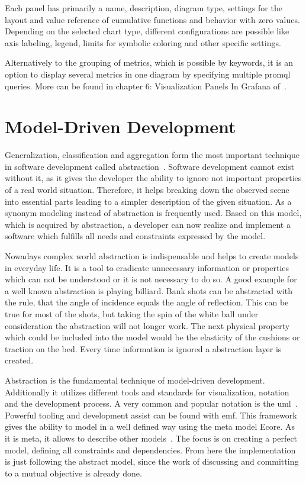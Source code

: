 Each panel has primarily a name, description, diagram type, settings for the layout and value reference of cumulative functions and behavior with zero values. Depending on the selected chart type, different configurations are possible like axis labeling, legend, limits for symbolic coloring and other specific settings.

Alternatively to the grouping of metrics, which is possible by keywords, it is an option to display several metrics in one diagram by specifying multiple \gls{promql} queries. More can be found in chapter 6: Visualization Panels In Grafana of~\cite{Salituro2020}.

\section{Model-Driven Development}

Generalization, classification and aggregation form the most important technique in software development called abstraction~\cite{Brambilla_2017}. Software development cannot exist without it, as it gives the developer the ability to ignore not important properties of a real world situation. Therefore, it helps breaking down the observed scene into essential parts leading to a simpler description of the given situation. As a synonym modeling instead of abstraction is frequently used. Based on this model, which is acquired by abstraction, a developer can now realize and implement a software which fulfills all needs and constraints expressed by the model. 

Nowadays complex world abstraction is indispensable and helps to create models in everyday life. It is a tool to eradicate unnecessary information or properties which can not be understood or it is not necessary to do so. A good example for a well known abstraction is playing billiard. Bank shots can be abstracted with the rule, that the angle of incidence equals the angle of reflection. This can be true for most of the shots, but taking the spin of the white ball under consideration the abstraction will not longer work. The next physical property which could be included into the model would be the elasticity of the cushions or traction on the bed. Every time information is ignored a abstraction layer is created.

Abstraction is the fundamental technique of model-driven development. Additionally it utilizes different tools and standards for visualization, notation and the development process. A very common and popular notation is the \gls{uml}~\cite{Cook2017}. Powerful tooling and development assist can be found with \gls{emf}. This framework gives the ability to model in a well defined way using the meta model Ecore. As it is meta, it allows to describe other models~\cite[section 2.3.1]{steinberg2008emf}. The focus is on creating a perfect model, defining all constraints and dependencies. From here the implementation is just following the abstract model, since the work of discussing and committing to a mutual objective is already done.

